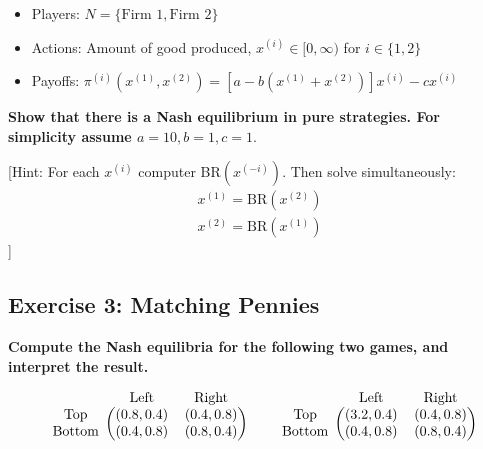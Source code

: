 \documentclass[10pt]{article}
\begin{document}
\begin{itemize}
    \item Players: \(N = \{\text{Firm } 1, \text{Firm } 2\}\)
    \item Actions: Amount of good produced, \(x^{(i)} \in [0, \infty)\) for \(i \in \{1, 2\}\)
    \item Payoffs: \(\pi^{(i)}(x^{(1)}, x^{(2)}) = [a - b (x^{(1)} + x^{(2)})] x^{(i)} - c x^{(i)}\)
\end{itemize}

\textbf{Show that there is a Nash equilibrium in pure strategies. For simplicity
assume \(a=10, b=1, c=1\)}.

[Hint: For each \(x^{(i)}\) computer BR\((x^{(-i)})\). Then solve simultaneously:
\begin{align*}
    x^{(1)}= \text{BR}(x^{(2)}) \\
    x^{(2)}= \text{BR}(x^{(1)})
\end{align*}
]

\subsection*{Exercise 3: Matching Pennies}

\textbf{Compute the Nash equilibria for the following two games, and interpret the result.}

\begin{equation*}
    \begin{blockarray}{ccc}
        & \text{Left} & \text{Right} \\
        \begin{block}{c(cc)}
            \text{Top} &    (0.8, 0.4) & (0.4, 0.8) \\
            \text{Bottom} & (0.4, 0.8) & (0.8, 0.4) \\
        \end{block}
    \end{blockarray}\qquad
    \begin{blockarray}{ccc}
        & \text{Left} & \text{Right} \\
        \begin{block}{c(cc)}
            \text{Top} &    (3.2, 0.4) & (0.4, 0.8) \\
            \text{Bottom} & (0.4, 0.8) & (0.8, 0.4) \\
        \end{block}
    \end{blockarray}
    \end{equation*}
\end{document}
